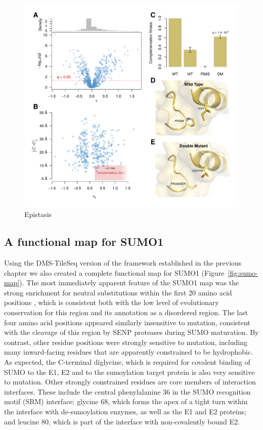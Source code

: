 \begin{figure}[h!]
	\centering
	\includegraphics[width=\textwidth]{img/epistasis.pdf}
	\caption{Epistasis}
	\label{fig:epsistasis}
\end{figure}


\subsection{A functional map for SUMO1}

Using the DMS-TileSeq version of the framework established in the previous chapter we also created a complete functional map for SUMO1 (Figure~\ref{fig:sumo-map}). The most immediately apparent feature of the SUMO1 map was the strong enrichment for neutral substitutions within the first 20 amino acid positions , which is consistent both with the low level of evolutionary conservation for this region and its annotation as a disordered region. The last four amino acid positions appeared similarly insensitive to mutation, consistent with the cleavage of this region by SENP proteases during SUMO maturation. By contrast, other residue positions were strongly sensitive to mutation, including many inward-facing residues that are apparently constrained to be hydrophobic. As expected, the C-terminal diglycine, which is required for covalent binding of SUMO to the E1, E2 and to the sumoylation target protein is also very sensitive to mutation. Other strongly constrained residues are core members of interaction interfaces. These include the central phenylalanine 36 in the SUMO recognition motif (SRM) interface; glycine 68, which forms the apex of a tight turn within the interface with de-sumoylation enzymes, as well as the E1 and E2 proteins; and leucine 80, which is part of the interface with non-covalently bound E2. 

